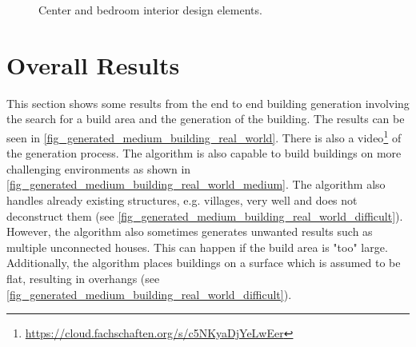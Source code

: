 \documentclass[
oneside,
fontsize=11pt
]{scrartcl}
\begin{document}
\begin{figure}[ht]
\begin{subfigure}[t]{0.3\textwidth}
  \end{subfigure}
  
  \caption{Center and bedroom interior design elements.}
  \label{fig_interior_design_center_bedroom}
\end{figure}


\section{Overall Results}
This section shows some results from the end to end building generation 
involving the search for a build area and the generation of the building.
The results can be seen in \autoref{fig_generated_medium_building_real_world}.
There is also a video\footnote{\url{https://cloud.fachschaften.org/s/c5NKyaDjYeLwEer}} of the generation process.
The algorithm is also capable to build buildings on more challenging 
environments as shown in \autoref{fig_generated_medium_building_real_world_medium}.
The algorithm also handles already existing structures, e.g. villages,
very well and does not deconstruct them (see \autoref{fig_generated_medium_building_real_world_difficult}).
However, the algorithm also sometimes generates unwanted results such as 
multiple unconnected houses. 
This can happen if the build area is "too" large. 
Additionally, the algorithm places buildings on a surface which is assumed to be flat,
resulting in overhangs (see \autoref{fig_generated_medium_building_real_world_difficult}).
\end{document}
